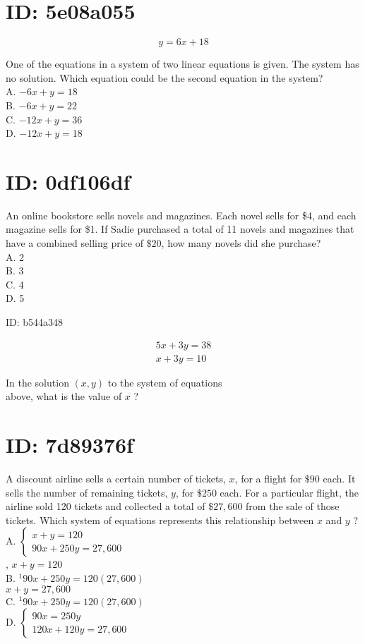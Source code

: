 \section*{ID: 5e08a055}
$$
y=6 x+18
$$

One of the equations in a system of two linear equations is given. The system has no solution. Which equation could be the second equation in the system?\\
A. $-6 x+y=18$\\
B. $-6 x+y=22$\\
C. $-12 x+y=36$\\
D. $-12 x+y=18$

\section*{ID: 0df106df}
An online bookstore sells novels and magazines. Each novel sells for \$4, and each magazine sells for \$1. If Sadie purchased a total of 11 novels and magazines that have a combined selling price of $\$ 20$, how many novels did she purchase?\\
A. 2\\
B. 3\\
C. 4\\
D. 5

ID: b544a348

$$
\begin{array}{r}
5 x+3 y=38 \\
x+3 y=10
\end{array}
$$

In the solution $(x, y)$ to the system of equations\\
above, what is the value of $x$ ?

\section*{ID: 7d89376f}
A discount airline sells a certain number of tickets, $x$, for a flight for $\$ 90$ each. It sells the number of remaining tickets, $y$, for $\$ 250$ each. For a particular flight, the airline sold 120 tickets and collected a total of $\$ 27,600$ from the sale of those tickets. Which system of equations represents this relationship between $x$ and $y$ ?\\
A. $\left\{\begin{array}{l}x+y=120 \\ 90 x+250 y=27,600\end{array}\right.$\\
, $x+y=120$\\
B. ${ }^{1} 90 x+250 y=120(27,600)$\\
$x+y=27,600$\\
C. ${ }^{1} 90 x+250 y=120(27,600)$\\
D. $\left\{\begin{array}{l}90 x=250 y \\ 120 x+120 y=27,600\end{array}\right.$

